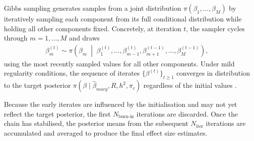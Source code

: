 Gibbs sampling generates samples from a joint distribution $\pi(\beta_1, \dots, \beta_M)$ by iteratively sampling each component from its full conditional distribution while holding all other components fixed. Concretely, at iteration $t$, the sampler cycles through $m = 1, \dots, M$ and draws
\begin{align*}
    \beta_m^{(t)} \sim \pi\!\left(\beta_m \;\middle|\; \beta_1^{(t)}, \dots, \beta_{m-1}^{(t)}, \beta_{m+1}^{(t-1)}, \dots, \beta_M^{(t-1)}\right),
\end{align*}
using the most recently sampled values for all other components. Under mild regularity conditions, the sequence of iterates $\{\beta^{(t)}\}_{t \geq 1}$ converges in distribution to the target posterior $\pi(\beta \mid \hat{\beta}_{marg}, R, h^2, \pi_c)$ regardless of the initial values \citep{GelmanBDA2013}.

Because the early iterates are influenced by the initialisation and may not yet reflect the target posterior, the first $N_{\text{burn-in}}$ iterations are discarded. Once the chain has stabilised, the posterior means from the subsequent $N_{\text{iter}}$ iterations are accumulated and averaged to produce the final effect size estimates.


